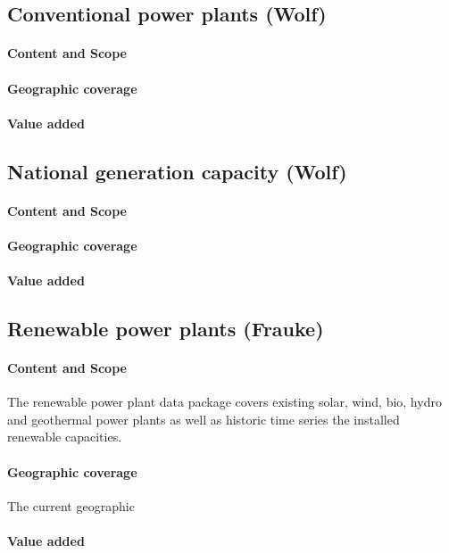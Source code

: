 \documentclass[article]{elsarticle}
\begin{document}
\subsection{Conventional power plants (Wolf)}
\paragraph{Content and Scope}
\paragraph{Geographic coverage}
\paragraph{Value added}

\subsection{National generation capacity (Wolf)}
\paragraph{Content and Scope}
\paragraph{Geographic coverage}
\paragraph{Value added}

\subsection{Renewable power plants (Frauke)}
\paragraph{Content and Scope}
The renewable power plant data package covers existing solar, wind, bio, hydro and geothermal power plants as well as historic time series the installed renewable capacities.

\paragraph{Geographic coverage} The current geographic 

\paragraph{Value added}
\end{document}
